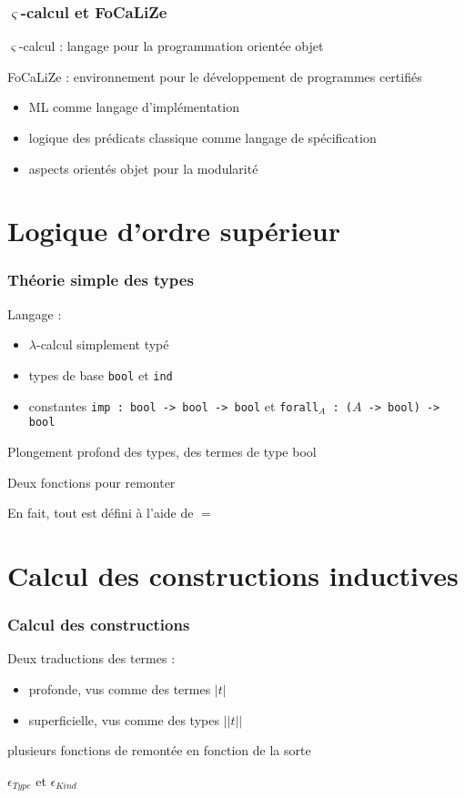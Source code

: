 \documentclass[12pt,aspectratio=169]{beamer}
\newcommand\lst[1]{{\lstinline{#1}}}
\begin{document}
\begin{frame}
  \frametitle{$\varsigma$-calcul et FoCaLiZe}

  $\varsigma$-calcul : langage pour la programmation orientée objet
  \bigskip
  
  FoCaLiZe : environnement pour le développement de programmes
  certifiés
  \begin{itemize}
  \item ML comme langage d'implémentation
  \item logique des prédicats classique comme langage de spécification
  \item aspects orientés objet pour la modularité
  \end{itemize}
\end{frame}

\section{Logique d'ordre supérieur}

\begin{frame}[fragile]
\frametitle{Théorie simple des types}
Langage : 
\begin{itemize}
\item $\lambda$-calcul simplement typé
\item
  types de base
  \lst{bool} et \lst{ind}
\item constantes \lst{imp : bool -> bool -> bool} et
  \texttt{forall$_A$ : ($A$ -> bool) -> bool}
\end{itemize}
\bigskip

Plongement profond des types, des termes de type bool

\medskip
Deux fonctions pour remonter
\pause\bigskip

En fait, tout est défini à l'aide de $=$

\end{frame}

\section{Calcul des constructions inductives}

\begin{frame}
  \frametitle{Calcul des constructions}
  Deux traductions des termes :
  \begin{itemize}
  \item profonde, vus comme des termes $|t|$
  \item superficielle, vus comme des types $||t||$
  \end{itemize}

  plusieurs fonctions de remontée en fonction de la sorte

  $\epsilon_{Type}$ et $\epsilon_{Kind}$
\end{frame}
\end{document}
